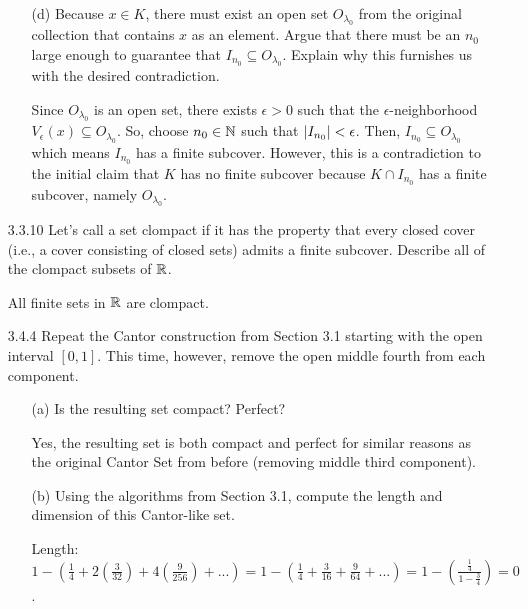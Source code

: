\documentclass[12pt,letterpaper]{article}
\begin{document}
\begin{itemize}[leftmargin=!,labelindent=5pt]
\begin{itemize}
                \item [(d)] Because $x \in K$, there must exist an open set $O_{\lambda_0}$ from the original collection that contains $x$ as an element. Argue that there must be an $n_0$ large enough to guarantee that $I_{n_0} \subseteq O_{\lambda_0}$. Explain why this furnishes us with the desired contradiction.
                
                    Since $O_{\lambda_0}$ is an open set, there exists $\epsilon > 0$ such that the $\epsilon$-neighborhood $V_\epsilon(x) \subseteq O_{\lambda_0}$.
                    So, choose $n_0 \in \mathbb{N}$ such that $\abs{I_{n_0}} < \epsilon$.
                    Then, $I_{n_0} \subseteq O_{\lambda_0}$ which means $I_{n_0}$ has a finite subcover.
                    However, this is a contradiction to the initial claim that $K$ has no finite subcover
                    because $K \cap I_{n_0}$ has a finite subcover, namely $O_{\lambda_0}$.
            \end{itemize}
        \item [3.3.10] Let’s call a set clompact if it has the property that every closed cover (i.e., a cover consisting of closed sets) admits a finite subcover. Describe all of the clompact subsets of $\mathbb{R}$.
            
            All finite sets in $\mathbb{R}$ are clompact.
        \item [3.4.4] Repeat the Cantor construction from Section 3.1 starting with the open interval $[0, 1]$. This time, however, remove the open middle fourth from each component.
            \begin{itemize}
                \item [(a)] Is the resulting set compact? Perfect?
                
                    Yes, the resulting set is both compact and perfect for similar reasons as the original Cantor Set from before (removing middle third component).
                \item [(b)] Using the algorithms from Section 3.1, compute the length and dimension of this Cantor-like set.
                
                    Length: $1 - (\frac{1}{4} + 2(\frac{3}{32}) + 4(\frac{9}{256}) + ... ) = 1 - (\frac{1}{4} + \frac{3}{16} + \frac{9}{64} + ... ) = 1 - (\frac{\frac{1}{4}}{1 - \frac{3}{4}}) = 0$.
                    

\end{itemize}
\end{itemize}
\end{document}
